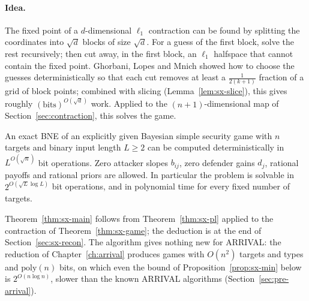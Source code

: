 \paragraph{Idea.} The fixed point of a $d$-dimensional $\ell_1$ contraction can be found by splitting
the coordinates into $\sqrt d$ blocks of size $\sqrt d$. For a guess of the first block, solve the rest
recursively; then cut away, in the first block, an $\ell_1$ halfspace that cannot contain the fixed point.
Ghorbani, Lopes and Mnich showed how to choose the guesses deterministically so that each cut removes at
least a $\frac1{2(k+1)}$ fraction of a grid of block points; combined with slicing (Lemma~\ref{lem:sx-slice}), this gives roughly $(\text{bits})^{O(\sqrt d)}$ work. Applied to the
$(n+1)$-dimensional map of Section~\ref{sec:contraction}, this solves the game.

\begin{theorem}\label{thm:sx-main}
\statusrefereed
An exact BNE of an explicitly given Bayesian simple security game with $n$ targets and binary input
length $L\ge2$ can be computed deterministically in $L^{O(\sqrt n)}$ bit operations. Zero attacker
slopes $b_{ij}$, zero defender gains $d_j$, rational payoffs and rational priors are allowed. In
particular the problem is solvable in $2^{O(\sqrt L\log L)}$ bit operations, and in polynomial time for
every fixed number of targets.
\end{theorem}

Theorem~\ref{thm:sx-main} follows from Theorem~\ref{thm:sx-pl} applied to the contraction of
Theorem~\ref{thm:sx-game}; the deduction is at the end of Section~\ref{sec:sx-recon}. The algorithm gives
nothing new for ARRIVAL: the reduction of Chapter~\ref{ch:arrival} produces games with $O(n^2)$
targets and types and $\mathrm{poly}(n)$ bits, on which even the bound of Proposition~\ref{prop:sx-min}
below is $2^{O(n\log n)}$, slower than the known ARRIVAL algorithms (Section~\ref{sec:pre-arrival}).

